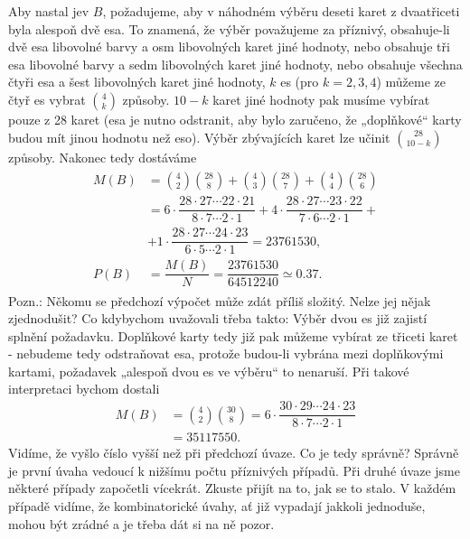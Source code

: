 \begin{mdframed}[style=mdexam]
\begin{example}
      Aby nastal jev \(B\), požadujeme, aby v náhodném výběru deseti karet z dvaatřiceti byla
      alespoň dvě esa. To znamená, že výběr považujeme za příznivý, obsahuje-li dvě esa libovolné
      barvy a osm libovolných karet jiné hodnoty, nebo obsahuje tři esa libovolné barvy a sedm
      libovolných karet jiné hodnoty, nebo obsahuje všechna čtyři esa a šest libovolných karet jiné
      hodnoty, \(k\) es (pro \(k = 2, 3, 4\)) můžeme ze čtyř es vybrat \(\binom{4}{k}\) způsoby.
      \(10 - k\) karet jiné hodnoty pak musíme vybírat pouze z \num{28} karet (esa je nutno
      odstranit, aby bylo zaručeno, že „doplňkové“ karty budou mít jinou hodnotu než eso). Výběr
      zbývajících karet lze učinit \(\binom{28}{10-k}\) způsoby. Nakonec
      tedy dostáváme
      \begin{gather*}
        \begin{align*}
          M(B) &= \binom{4}{2}\binom{28}{8} +\binom{4}{3}\binom{28}{7} +\binom{4}{4}\binom{28}{6} \\
               &=  6\cdot\dfrac{28\cdot27\cdots22\cdot21}{8\cdot7\cdots2\cdot1}
                  +4\cdot\dfrac{28\cdot27\cdots23\cdot22}{7\cdot6\cdots2\cdot1}+                  \\
               &  +1\cdot\dfrac{28\cdot27\cdots24\cdot23}{6\cdot5\cdots2\cdot1} = \num{23761530}, \\
          P(B) &= \dfrac{M(B)}{N} = \dfrac{\num{23761530}}{\num{64512240}} \simeq\num{0.37}.
        \end{align*}
      \end{gather*}
      Pozn.: Někomu se předchozí výpočet může zdát příliš složitý. Nelze jej nějak zjednodušit? Co
      kdybychom uvažovali třeba takto: Výběr dvou es již zajistí splnění požadavku. Doplňkové karty
      tedy již pak můžeme vybírat ze třiceti karet - nebudeme tedy odstraňovat esa, protože budou-li
      vybrána mezi doplňkovými kartami, požadavek „alespoň dvou es ve výběru“ to nenaruší. Při
      takové interpretaci bychom dostali
      \begin{align*}
        M(B) &= \binom{4}{2}\binom{30}{8}   
              = 6\cdot\dfrac{30\cdot29\cdots24\cdot23}{8\cdot7\cdots2\cdot1}     \\
             &= \num{35117550}.
      \end{align*}
      Vidíme, že vyšlo číslo vyšší než při předchozí úvaze. Co je tedy správně? Správně je první
      úvaha vedoucí k nižšímu počtu příznivých případů. Při druhé úvaze jsme některé případy
      započetli vícekrát. Zkuste přijít na to, jak se to stalo. V každém případě vidíme, že
      kombinatorické úvahy, ať již vypadají jakkoli jednoduše, mohou být zrádné a je třeba dát si na
      ně pozor. 
      

\end{example}
\end{mdframed}
